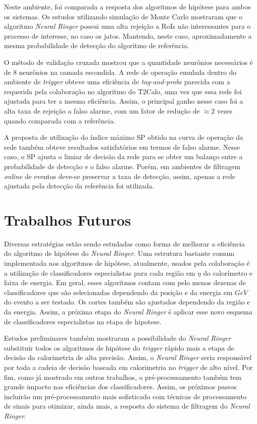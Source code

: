 Neste ambiente, foi comparada a resposta dos algoritmos de hipótese para ambos os sistemas. Os estudos
utilizando simulação de Monte Carlo mostraram que o algoritmo \textit{Neural Ringer} possui uma alta rejeição
a RoIs não interessantes para o processo de interesse, no caso os jatos. Mantendo, neste caso, aproximadamente
a mesma probabilidade de detecção do algoritmo de referência.

O método de validação cruzada mostrou que a quantidade neurônios necessários é de 8 neurônios na
camada escondida. A rede de operação emulada dentro do ambiente de \textit{trigger} obteve uma eficiência de
\textit{tag-and-probe} parecida com a requerida pela colaboração no algoritmo do T2Calo, uma vez que essa rede
foi ajustada para ter a mesma eficiência. Assim, o principal ganho nesse caso foi a alta taxa de rejeição
a falso alarme, com um fator de redução de  $\approx2$ vezes quando comparada com a referência.

A proposta de utilização do índice máximo SP obtido na curva de operação da rede também obteve
resultados satisfatórios em termos de falso alarme. Nesse caso, o SP ajusta o limiar de decisão da rede
para se obter um balanço entre a probabilidade de detecção e o falso alarme.  Porém, em ambientes
de filtragem \textit{online} de eventos deve-se preservar a taxa de detecção, assim, apenas a rede
ajustada pela detecção da referência foi utilizada.


\section{Trabalhos Futuros}

Diversas estratégias estão sendo estudadas como forma de melhorar a eficiência do algoritmo de hipótese do
\textit{Neural Ringer}. Uma estrutura bastante comum implementada nos algoritmos de hipótese, atualmente, 
usados pela colaboração é a utilização de classificadores especialistas para cada região em $\eta$ do calorímetro e faixa de energia.
Em geral, esses algoritmos contam com pelo menos dezenas de classificadores que são selecionadas dependendo da posição e da energia
em $GeV$ do evento a ser testado. Os cortes também são ajustados dependendo da região e da energia. Assim, a próxima etapa do \textit{Neural Ringer}
é aplicar esse novo esquema de classificadores especialistas na etapa de hipotese.

Estudos preliminares também mostraram a possibilidade do \textit{Neural Ringer} substituir todos os algoritmos de hipótese do \textit{trigger} rápido mais 
a etapa de decisão da calorimetria de alta precisão. Assim, o  \textit{Neural Ringer} seria responsável por toda a cadeia de decisão baseada em calorimetria
no \textit{trigger} de alto nível. Por fim, como já mostrado em outros trabalhos, o pré-processamento também tem grande impacto nas eficiências dos 
classificadores. Assim, os próximos passos incluirão um pré-processamento mais sofisticado com técnicas de processamento de sinais para otimizar, ainda mais, 
a resposta do sistema de filtragem do \textit{Neural Ringer}.







